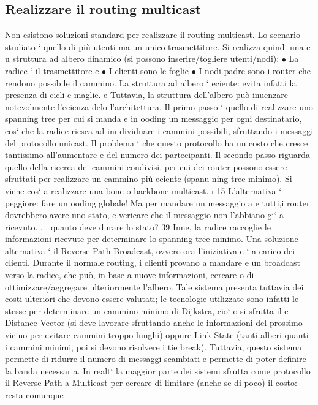\documentclass[a4paper,12pt]{article}
\begin{document}
\subsection{Realizzare il routing multicast}
Non esistono soluzioni standard per realizzare il routing multicast. Lo scenario
studiato ` quello di più utenti ma un unico trasmettitore. Si realizza quindi una
e
u
struttura ad albero dinamico (si possono inserire/togliere utenti/nodi):
$\bullet$ La radice ` il trasmettitore
e
$\bullet$ I clienti sono le foglie
$\bullet$ I nodi padre sono i router che rendono possibile il cammino.
La struttura ad albero ` eciente: evita infatti la presenza di cicli e maglie.
e
Tuttavia, la struttura dell'albero può inuenzare notevolmente l'ecienza delo
l'architettura.
Il primo passo ` quello di realizzare uno spanning tree per cui si manda
e
in ooding un messaggio per ogni destinatario, cos` che la radice riesca ad in\i{}
dividuare i cammini possibili, sfruttando i messaggi del protocollo unicast. Il
problema ` che questo protocollo ha un costo che cresce tantissimo all'aumentare
e
del numero dei partecipanti.
Il secondo passo riguarda quello della ricerca dei cammini condivisi, per cui
dei router possono essere sfruttati per realizzare un cammino più eciente (spanu
ning tree minimo). Si viene cos` a realizzare una bone o backbone multicast.
\i{}
15 L'alternativa ` peggiore: fare un ooding globale! Ma per mandare un messaggio a
e
tutti,i router dovrebbero avere uno stato, e vericare che il messaggio non l'abbiano gi`
a
ricevuto. . . quanto deve durare lo stato?
39
Inne, la radice raccoglie le informazioni ricevute per determinare lo spanning
tree minimo.
Una soluzione alternativa ` il Reverse Path Broadcast, ovvero ora l'iniziativa
e
` a carico dei clienti. Durante il normale routing, i clienti provano a mandare
e
un broadcast verso la radice, che può, in base a nuove informazioni, cercare
o
di ottimizzare/aggregare ulteriormente l'albero. Tale sistema presenta tuttavia
dei costi ulteriori che devono essere valutati; le tecnologie utilizzate sono infatti
le stesse per determinare un cammino minimo di Dijkstra, cio` o si sfrutta il
e
Distance Vector (si deve lavorare sfruttando anche le informazioni del prossimo
vicino per evitare cammini troppo lunghi) oppure Link State (tanti alberi quanti
i cammini minimi, poi si devono risolvere i tie break). Tuttavia, questo sistema
permette di ridurre il numero di messaggi scambiati e permette di poter definire
la banda necessaria.
In realt` la maggior parte dei sistemi sfrutta come protocollo il Reverse Path
a
Multicast per cercare di limitare (anche se di poco) il costo: resta comunque
\end{document}
